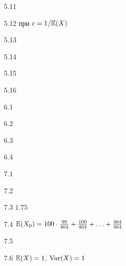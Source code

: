 \protect \hypertarget {soln:5.11}{}
\begin{solution}{{5.11}}
\end{solution}
\protect \hypertarget {soln:5.12}{}
\begin{solution}{{5.12}}
при $c=1/\mathbb{E}(X)$
\end{solution}
\protect \hypertarget {soln:5.13}{}
\begin{solution}{{5.13}}
\end{solution}
\protect \hypertarget {soln:5.14}{}
\begin{solution}{{5.14}}
\end{solution}
\protect \hypertarget {soln:5.15}{}
\begin{solution}{{5.15}}
\end{solution}
\protect \hypertarget {soln:5.16}{}
\begin{solution}{{5.16}}
\end{solution}
\protect \hypertarget {soln:6.1}{}
\begin{solution}{{6.1}}

\end{solution}
\protect \hypertarget {soln:6.2}{}
\begin{solution}{{6.2}}
\end{solution}
\protect \hypertarget {soln:6.3}{}
\begin{solution}{{6.3}}

\end{solution}
\protect \hypertarget {soln:6.4}{}
\begin{solution}{{6.4}}

\end{solution}
\protect \hypertarget {soln:7.1}{}
\begin{solution}{{7.1}}
\end{solution}
\protect \hypertarget {soln:7.2}{}
\begin{solution}{{7.2}}
\end{solution}
\protect \hypertarget {soln:7.3}{}
\begin{solution}{{7.3}}
$1.75$
\end{solution}
\protect \hypertarget {soln:7.4}{}
\begin{solution}{{7.4}}
  $\mathbb{E}(X_0)=100\cdot \frac{99}{464} + \frac{100}{464} + \ldots + \frac{464}{464}$
\end{solution}
\protect \hypertarget {soln:7.5}{}
\begin{solution}{{7.5}}
\end{solution}
\protect \hypertarget {soln:7.6}{}
\begin{solution}{{7.6}}
$\mathbb{E}(X)=1$, $\operatorname{Var}(X)=1$
\end{solution}
